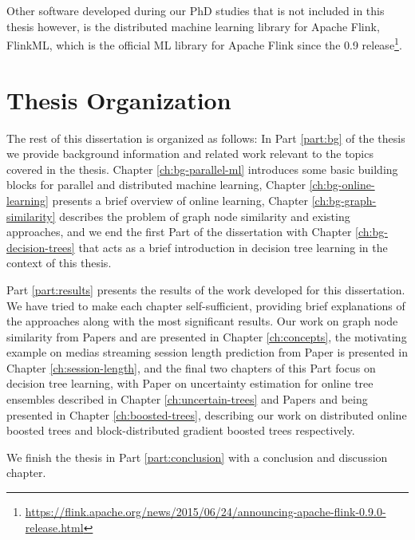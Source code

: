 Other software developed during our PhD studies that is not included in this
thesis however, is the distributed machine learning library for
Apache Flink, FlinkML, which is the official ML library for Apache Flink
since the 0.9 release\footnote{\url{https://flink.apache.org/news/2015/06/24/announcing-apache-flink-0.9.0-release.html}}.

\section{Thesis Organization}

The rest of this dissertation is organized as follows:
In Part \ref{part:bg} of the thesis we provide background information and
related work relevant to the topics covered in the thesis. Chapter
\ref{ch:bg-parallel-ml} introduces some basic building blocks
for parallel and distributed machine learning, Chapter \ref{ch:bg-online-learning}
presents a brief overview of online learning, Chapter \ref{ch:bg-graph-similarity} describes the problem
of graph node similarity and existing approaches, and we end the first Part of the dissertation
with Chapter \ref{ch:bg-decision-trees} that acts as a brief introduction
in decision tree learning in the context of this thesis.

Part \ref{part:results} presents the results of the work developed for this
dissertation. We have tried to make each chapter self-sufficient, providing
brief explanations of the approaches along with the most significant results.
Our work on graph node similarity from Papers \conceptsicdmNum and \conceptskaisNum are presented in Chapter \ref{ch:concepts},
the motivating example on medias streaming session length prediction from Paper \sessionlengthNum is presented in Chapter \ref{ch:session-length}, and the final
two chapters of this Part focus on decision tree learning, with Paper \uncertaintreesNum
on uncertainty estimation for online tree ensembles described in Chapter \ref{ch:uncertain-trees} and Papers \boostvhtNum and \blockgbtNum
being presented in Chapter \ref{ch:boosted-trees}, describing our work on distributed online boosted trees
and block-distributed gradient boosted trees respectively.

We finish the thesis in Part \ref{part:conclusion} with a conclusion and discussion
chapter.
